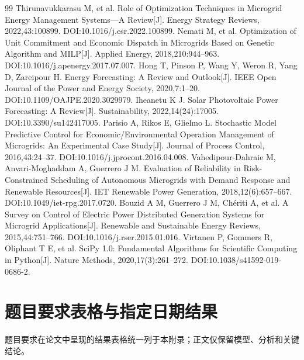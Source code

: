 \documentclass[12pt,a4paper,fontset=fandol]{ctexart}
\begin{document}
\begin{thebibliography}{99}
    \small
    \setlength{\itemsep}{0pt}
     Thirunavukkarasu M, et al. Role of Optimization Techniques in Microgrid Energy Management Systems---A Review[J]. Energy Strategy Reviews, 2022,43:100899. DOI:10.1016/j.esr.2022.100899.
     Nemati M, et al. Optimization of Unit Commitment and Economic Dispatch in Microgrids Based on Genetic Algorithm and MILP[J]. Applied Energy, 2018,210:944--963. DOI:10.1016/j.apenergy.2017.07.007.
     Hong T, Pinson P, Wang Y, Weron R, Yang D, Zareipour H. Energy Forecasting: A Review and Outlook[J]. IEEE Open Journal of the Power and Energy Society, 2020,7:1--20. DOI:10.1109/OAJPE.2020.3029979.
     Iheanetu K J. Solar Photovoltaic Power Forecasting: A Review[J]. Sustainability, 2022,14(24):17005. DOI:10.3390/su142417005.
     Parisio A, Rikos E, Glielmo L. Stochastic Model Predictive Control for Economic/Environmental Operation Management of Microgrids: An Experimental Case Study[J]. Journal of Process Control, 2016,43:24--37. DOI:10.1016/j.jprocont.2016.04.008.
     Vahedipour-Dahraie M, Anvari-Moghaddam A, Guerrero J M. Evaluation of Reliability in Risk-Constrained Scheduling of Autonomous Microgrids with Demand Response and Renewable Resources[J]. IET Renewable Power Generation, 2018,12(6):657--667. DOI:10.1049/iet-rpg.2017.0720.
     Bouzid A M, Guerrero J M, Chériti A, et al. A Survey on Control of Electric Power Distributed Generation Systems for Microgrid Applications[J]. Renewable and Sustainable Energy Reviews, 2015,44:751--766. DOI:10.1016/j.rser.2015.01.016.
     Virtanen P, Gommers R, Oliphant T E, et al. SciPy 1.0: Fundamental Algorithms for Scientific Computing in Python[J]. Nature Methods, 2020,17(3):261--272. DOI:10.1038/s41592-019-0686-2.
\end{thebibliography}

\clearpage
\appendix
\section{题目要求表格与指定日期结果}
题目要求在论文中呈现的结果表格统一列于本附录；正文仅保留模型、分析和关键结论。
\end{document}
